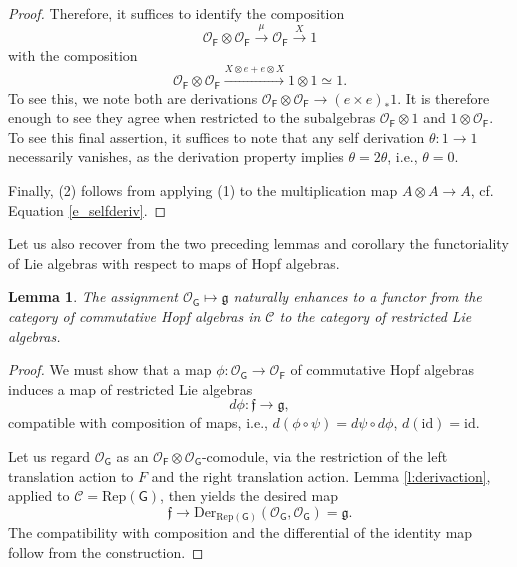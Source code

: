 \documentclass{amsart}
\newtheorem{Lem}[Thm]{Lemma}
\theoremstyle{definition}
\newcommand{\OOF}{\OO_{\mathsf{F}}}
\newcommand{\OOG}{\OO_{\mathsf{G}}}
\newcommand{\RepG}{\Rep(\mathsf{G})}
\newcommand{\Rep}{\on{Rep}}
\newcommand{\sC}{\mathscr{C}}
\newcommand{\fg}{\mathfrak{g}}
\newcommand{\OO}{\mathscr{O}}
\newcommand{\on}{\mathrm}
\newcommand{\ff}{\mathfrak{f}}
\numberwithin{equation}{section}
\begin{document}
{\begin{proof}
Therefore, it suffices to identify the composition 
\begin{equation} \label{e:deriv1} \OOF \otimes \OOF \xrightarrow{\mu} \OOF \xrightarrow{X} 1\end{equation}
with the composition
\begin{equation} \label{e:deriv2}\OOF \otimes \OOF \xrightarrow{X \otimes e + e \otimes X} 1 \otimes 1 \simeq 1.\end{equation}
To see this, we note both are derivations $\OOF \otimes \OOF \rightarrow (e \times e)_* 1.$ It is therefore enough to see they agree when restricted to the subalgebras $\OOF \otimes 1$ and $1 \otimes \OOF$. To see this final assertion, it suffices to note that any self derivation $\theta: 1 \rightarrow 1$ necessarily vanishes, as the derivation property implies $\theta = 2 \theta$, i.e., $\theta = 0$. 

Finally, (2) follows from applying (1) to the multiplication map $A \otimes A \rightarrow A$, cf. Equation \eqref{e_selfderiv}.     
\end{proof}



}


Let us also recover from the two preceding lemmas and corollary the functoriality of Lie algebras with respect to maps of Hopf algebras. 

\begin{Lem}\label{l:bert} The assignment $\OOG\mapsto \mathfrak{g}$ naturally enhances to a functor from the category of commutative Hopf algebras in $\sC$ to the category of restricted Lie algebras. 
\end{Lem}

\begin{proof} We must show that a map $\phi: \OOG \rightarrow \OOF$ of commutative Hopf algebras induces a map of restricted Lie algebras
$$d\phi: \ff \rightarrow \fg,$$
compatible with composition of maps, i.e., $d(\phi \circ \psi) = d\psi \circ d\phi$, $d(\on{id}) = \on{id}$.


Let us regard $\OOG$ as an $\OOF \otimes \OOG$-comodule, via the restriction of the left translation action to $F$ and the right translation action. Lemma \ref{l:derivaction}, applied to $\sC = \RepG$, then yields the desired map 
$$\ff \rightarrow \on{Der}_{\RepG}(\OOG, \OOG) = \fg.$$The compatibility with composition and the differential of the identity map follow from the construction.  \end{proof}
\end{document}
